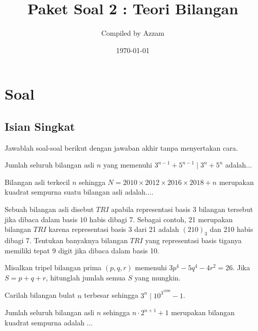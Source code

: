 \documentclass[12pt]{scrartcl}
\begin{document}
	\title{Paket Soal 2 : Teori Bilangan} %
	\date{\today}
	\author{Compiled by Azzam}
	\maketitle

\renewcommand*\contentsname{Daftar Isi}
\tableofcontents

\newpage
	\newpage
	
	\section{Soal}
\subsection{Isian Singkat}
Jawablah soal-soal berikut dengan jawaban akhir tanpa menyertakan cara.
	
	
	\begin{soalbaru}
		Jumlah seluruh bilangan asli $n$ yang memenuhi $3^{n-1}+5^{n-1} \mid 3^n + 5^{n}$ adalah...
	\end{soalbaru}
	
	\begin{soalbaru}
		Bilangan asli terkecil $n$ sehingga $N = 2010 \times 2012 \times 2016 \times 2018 + n$ merupakan kuadrat sempurna suatu bilangan asli adalah....
	\end{soalbaru}
	
	\begin{soalbaru}
		Sebuah bilangan asli disebut $TRI$ apabila representasi basis $3$ bilangan tersebut jika dibaca dalam basis $10$ habis dibagi 7. Sebagai contoh, 21 merupakan bilangan $TRI$ karena representasi basis 3 dari 21 adalah $(210)_3$ dan 210 habis dibagi 7. Tentukan banyaknya bilangan $TRI$ yang representasi basis tiganya memiliki tepat 9 digit jika dibaca dalam basis 10.
	\end{soalbaru}
	
	\begin{soalbaru}
		Misalkan tripel bilangan prima $(p,q,r)$ memenuhi $3p^4-5q^4-4r^2=26$. Jika $S = p+q+r$, hitunglah jumlah semua $S$ yang mungkin.
	\end{soalbaru}
	
	\begin{soalbaru}
		Carilah bilangan bulat $n$ terbesar sehingga $3^n \mid 10^{3^{1999}} - 1$.
	\end{soalbaru}
	
	\begin{soalbaru}
		Jumlah seluruh bilangan asli $n$ sehingga $n\cdot 2^{n+1}+1$ merupakan bilangan kuadrat sempurna adalah $\dots$
	\end{soalbaru}
\end{document}
